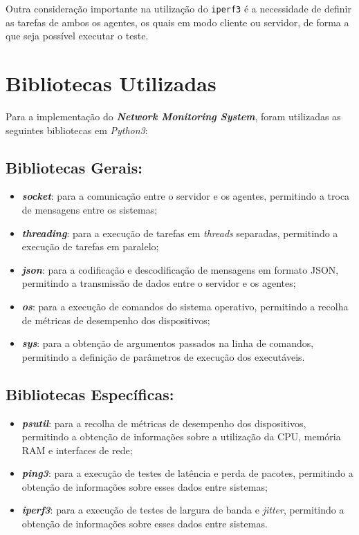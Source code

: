 \documentclass[a4paper,12pt]{scrreprt}
\begin{document}
Outra consideração importante na utilização do \texttt{iperf3} é a necessidade de
definir as tarefas de ambos os agentes, os quais em modo cliente ou servidor,
de forma a que seja possível executar o teste.

\section{Bibliotecas Utilizadas}

Para a implementação do \textbf{\textit{Network Monitoring System}}, foram utilizadas
as seguintes bibliotecas em \textit{Python3}:

\subsection{Bibliotecas Gerais:}
\begin{itemize}
    \item \textbf{\textit{socket}}: para a comunicação entre o servidor e os agentes,
    permitindo a troca de mensagens entre os sistemas;
    \item \textbf{\textit{threading}}: para a execução de tarefas em \textit{threads} separadas,
    permitindo a execução de tarefas em paralelo;
    \item \textbf{\textit{json}}: para a codificação e descodificação de mensagens em formato JSON,
    permitindo a transmissão de dados entre o servidor e os agentes;
    \item \textbf{\textit{os}}: para a execução de comandos do sistema operativo, permitindo a
    recolha de métricas de desempenho dos dispositivos;
    \item \textbf{\textit{sys}}: para a obtenção de argumentos passados na linha de comandos,
    permitindo a definição de parâmetros de execução dos executáveis.
\end{itemize}

\subsection{Bibliotecas Específicas:}
\begin{itemize}
    \item \textbf{\textit{psutil}}: para a recolha de métricas de desempenho dos dispositivos,
    permitindo a obtenção de informações sobre a utilização da CPU, memória RAM e interfaces de rede;
    \item \textbf{\textit{ping3}}: para a execução de testes de latência e perda de pacotes,
    permitindo a obtenção de informações sobre esses dados entre sistemas;
    \item \textbf{\textit{iperf3}}: para a execução de testes de largura de banda e \textit{jitter},
    permitindo a obtenção de informações sobre esses dados entre sistemas.
\end{itemize}
\end{document}
